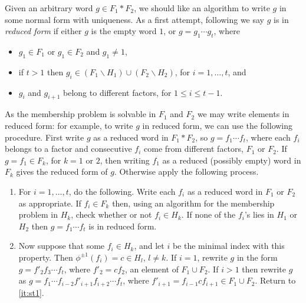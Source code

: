 \documentclass[a4paper,12pt]{article}
\numberwithin{equation}{section}
\numberwithin{figure}{section}
\newcommand{\be}{\begin{enumerate}}
\newcommand{\ee}{\end{enumerate}}
\begin{document}
Given an arbitrary word $g\in F_1\ast F_2$,
we should like an algorithm to write $g$ in
some normal form with uniqueness. As a first attempt, following \cite{LS}  
 we say $g$ is in \emph{reduced form} if either $g$ is the empty word $1$, or
$g = g_1 \cdots g_t$, where
\begin{itemize}
\item
$g_1 \in F_1$ or $g_1 \in F_2$ and $g_1\neq 1$,  
\item
if 
$t > 1$ then   $g_i \in (F_1 \backslash H_1)\cup (F_2\backslash H_2)$,
for $i=1,\ldots ,t$, and
\item    $g_i$
and  ${g_{i+1}}$ belong to  different factors, for $1\le i\le t-1$.
\end{itemize}
As the membership problem
is solvable in $F_1$ and $F_2$ we may write elements in reduced form: for example,
to write $g$ in reduced form,
we can use the following procedure.
First write $g$  as a reduced word in $F_1\ast F_2$, so $g=f_1\cdots f_t$, where
each $f_i$ belongs to a factor and
consecutive $f_i$ come from different factors, $F_1$ or $F_2$. 
If $g=f_1\in F_k$, for $k=1$ or $2$, then writing $f_1$ as a 
reduced (possibly empty) word in $F_k$ gives the  reduced form of $g$. 
Otherwise
 apply the
following process.
\be[Step 1]
\item\label{it:st1} For $i=1,\ldots ,t$, do the following.
Write each $f_i$ as  a reduced word in $F_1$ or $F_2$ as appropriate.
If $f_i\in F_k$ then,
using an algorithm for the membership problem in $H_k$, check whether or not
$f_i \in H_k$.
 If none of the $f_i$'s lies in $H_1$ or $H_2$ then
$g= f_1 \cdots f_t$ is in  reduced form.
\item\label{it:st2}  Now suppose that some $f_i \in H_k$,  and let  $i$ be the
minimal index with this property. Then $\phi^{\pm 1}(f_i)=c\in H_{l}$, $l\neq k$.
If $i = 1$, rewrite $g$  in the
form $g = f'_2 f_3 \cdots f_t$,  where  $f'_2 = cf_2$, an element of $F_1\cup F_2$.
If $i > 1$ then rewrite $g$ as
$g = f_1 \cdots f_{i-2} f'_{i+1}f_{i+2} \cdots f_t$, where
$f'_{i+1} = f_{i-1}c f_{i+1}\in F_1\cup F_2$. Return to
\ref{it:st1}.
\ee
\end{document}
